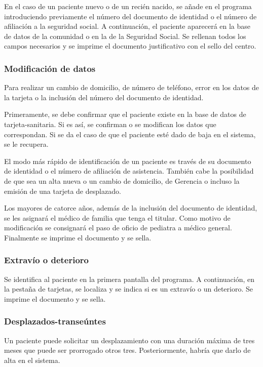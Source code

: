 En el caso de un paciente nuevo o de un recién nacido, se añade en el programa introduciendo previamente el número del documento de identidad o el número de afiliación a la seguridad social.
A continuación, el paciente aparecerá en la base de datos de la comunidad o en la de la Seguridad Social.
Se rellenan todos los campos necesarios y se imprime el documento justificativo con el sello del centro.

\subsubsection{Modificación de datos}

Para realizar un cambio de domicilio, de número de teléfono, error en los datos de la tarjeta o la inclusión del número del documento de identidad.

Primeramente, se debe confirmar que el paciente existe en la base de datos de \Gls{tarjeta-sanitaria}.
Si es así, se confirman o se modifican los datos que correspondan.
Si se da el caso de que el paciente esté dado de baja en el sistema, se le recupera.

El modo más rápido de identificación de un paciente es través de su documento de identidad o el número de afiliación de asistencia.
También cabe la posibilidad de que sea un alta nueva o un cambio de domicilio, de Gerencia o incluso la emisión de una tarjeta de desplazado.

Los mayores de catorce años, además de la inclusión del documento de identidad, se les asignará el médico de familia que tenga el titular.
Como motivo de modificación se consignará el paso de oficio de pediatra a médico general.
Finalmente se imprime el documento y se sella.

\subsubsection{Extravío o deterioro}

Se identifica al paciente en la primera pantalla del programa.
A continuación, en la pestaña de tarjetas, se localiza y se indica si es un extravío o un deterioro.
Se imprime el documento y se sella.

\subsubsection{Desplazados-transeúntes}

Un paciente puede solicitar un desplazamiento con una duración máxima de tres meses que puede ser prorrogado otros tres.
Posteriormente, habría que darlo de alta en el sistema.

